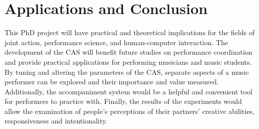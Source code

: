 \documentclass[12pt]{scrartcl}
\begin{document}

\section{Applications and Conclusion}
\label{applications-conclusion}

This PhD project will have practical and theoretical implications for the fields of joint action, performance science, and human-computer interaction. The development of the CAS will benefit future studies on performance coordination and provide practical applications for performing musicians and music students. By tuning and altering the parameters of the CAS, separate aspects of a music performer can be explored and their importance and value measured. Additionally, the accompaniment system would be a helpful and convenient tool for performers to practice with. Finally, the results of the experiments would allow the examination of people's perceptions of their partners' creative abilities, responsiveness and intentionality. 




\end{document}
